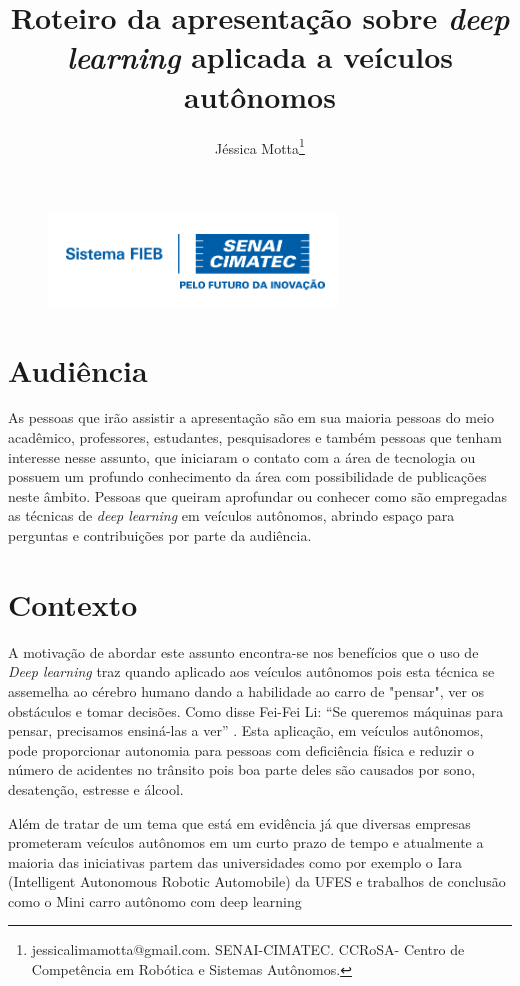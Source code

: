 \documentclass[12pt,a4paper]{article}
\begin{document}
 
\begin{figure}
    \flushright
    \includegraphics[scale=0.5]{Logo_senai.png}
\end{figure}

\title{Roteiro da apresentação sobre \emph{deep learning} aplicada a veículos autônomos}
\author{Jéssica Motta\thanks{jessicalimamotta@gmail.com. SENAI-CIMATEC. CCRoSA- Centro de Competência em Robótica e Sistemas Autônomos.}}
 

    \maketitle
    \singlespacing

    \section{Audiência}

    \par As pessoas que irão assistir a apresentação são em sua maioria pessoas do meio acadêmico, professores, estudantes, pesquisadores e também pessoas que tenham interesse nesse assunto, que iniciaram o contato com a área de tecnologia ou possuem um profundo conhecimento da área com possibilidade de publicações neste âmbito. Pessoas que queiram aprofundar ou conhecer como são empregadas as técnicas de \emph{deep learning} em veículos autônomos, abrindo espaço para perguntas e contribuições por parte da audiência.

    \section{Contexto}
    \par A motivação de abordar este assunto encontra-se nos benefícios que o uso de \emph{Deep learning} traz quando aplicado aos veículos autônomos pois esta técnica se assemelha ao cérebro humano dando a habilidade ao carro de "pensar", ver os obstáculos e tomar decisões. Como disse Fei-Fei Li: “Se queremos máquinas para pensar, precisamos ensiná-las a ver” \cite{1}. Esta aplicação, em veículos autônomos, pode proporcionar autonomia para pessoas com deficiência física e reduzir o número de acidentes no trânsito pois boa parte deles são causados por sono, desatenção, estresse e álcool. 
    \par Além de tratar de um tema que está em evidência já que diversas empresas prometeram veículos autônomos em um curto prazo de tempo  e atualmente a maioria das iniciativas partem das universidades como por exemplo o Iara (Intelligent Autonomous Robotic Automobile) da UFES e trabalhos de conclusão como o Mini carro autônomo com deep learning \cite{2}
    
\end{document}
